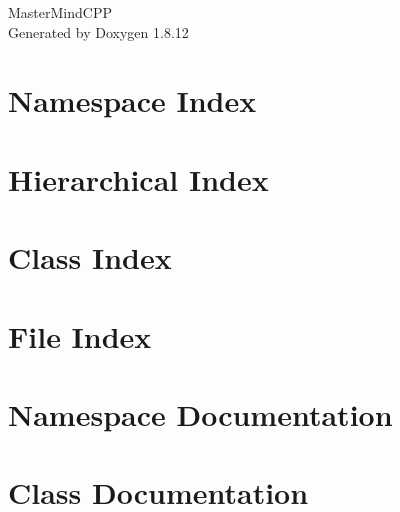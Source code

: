 \documentclass[twoside]{book}
\newcommand{\+}{\discretionary{\mbox{\scriptsize$\hookleftarrow$}}{}{}}
\newcommand{\clearemptydoublepage}{%
  \newpage{\pagestyle{empty}\cleardoublepage}%
}
\begin{document}
\hypersetup{pageanchor=false,
             bookmarksnumbered=true,
             pdfencoding=unicode
            }
\begin{titlepage}
\vspace*{7cm}
\begin{center}%
{\Large Master\+Mind\+C\+PP }\\
\vspace*{1cm}
{\large Generated by Doxygen 1.8.12}\\
\end{center}
\end{titlepage}
\clearemptydoublepage
{}
\tableofcontents
\clearemptydoublepage
{}
\hypersetup{pageanchor=true}

\chapter{Namespace Index}

\chapter{Hierarchical Index}

\chapter{Class Index}

\chapter{File Index}

\chapter{Namespace Documentation}








\chapter{Class Documentation}




















\end{document}
